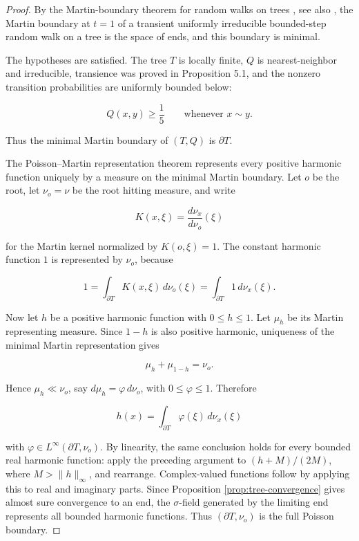 \documentclass[11pt,a4paper]{scrartcl}
\begin{document}
\begin{proof}
By the Martin-boundary theorem for random walks on trees
\cite{PicardelloWoess1987}, see also \cite[Chapter 9.C]{Woess2009}, the Martin
boundary at \(t=1\) of a transient uniformly irreducible bounded-step random
walk on a tree is the space of ends, and this boundary is minimal.

The hypotheses are satisfied. The tree \(T\) is locally finite, \(Q\) is
nearest-neighbor and irreducible, transience was proved in Proposition 5.1, and
the nonzero transition probabilities are uniformly bounded below:

\[
Q(x,y)\ge \frac15
\qquad
\text{whenever }x\sim y .
\]

Thus the minimal Martin boundary of \((T,Q)\) is \(\partial T\).

The Poisson--Martin representation theorem
\cite[Chapter 7.D--E, Theorems 7.53 and 7.61]{Woess2009} represents every
positive harmonic function uniquely by a measure on the minimal Martin
boundary. Let \(o\) be the root, let \(\nu_o=\nu\) be the root hitting measure,
and write

\[
K(x,\xi)=\frac{d\nu_x}{d\nu_o}(\xi)
\]

for the Martin kernel normalized by \(K(o,\xi)=1\). The constant harmonic
function \(1\) is represented by \(\nu_o\), because

\[
1=\int_{\partial T}K(x,\xi)\,d\nu_o(\xi)
  =\int_{\partial T}1\,d\nu_x(\xi).
\]

Now let \(h\) be a positive harmonic function with \(0\le h\le1\). Let
\(\mu_h\) be its Martin representing measure. Since \(1-h\) is also positive
harmonic, uniqueness of the minimal Martin representation gives

\[
\mu_h+\mu_{1-h}=\nu_o.
\]

Hence \(\mu_h\ll\nu_o\), say \(d\mu_h=\varphi\,d\nu_o\), with
\(0\le\varphi\le1\). Therefore

\[
h(x)=\int_{\partial T}\varphi(\xi)\,d\nu_x(\xi)
\]

with \(\varphi\in L^\infty(\partial T,\nu_o)\). By linearity, the same
conclusion holds for every bounded real harmonic function: apply the preceding
argument to
\((h+M)/(2M)\), where \(M>\|h\|_\infty\), and rearrange. Complex-valued
functions follow by applying this to real and imaginary parts. Since Proposition
\ref{prop:tree-convergence} gives almost sure convergence to an end, the
\(\sigma\)-field generated by the limiting end represents all bounded harmonic
functions. Thus \((\partial T,\nu_o)\) is the full Poisson boundary.
\end{proof}
\end{document}
